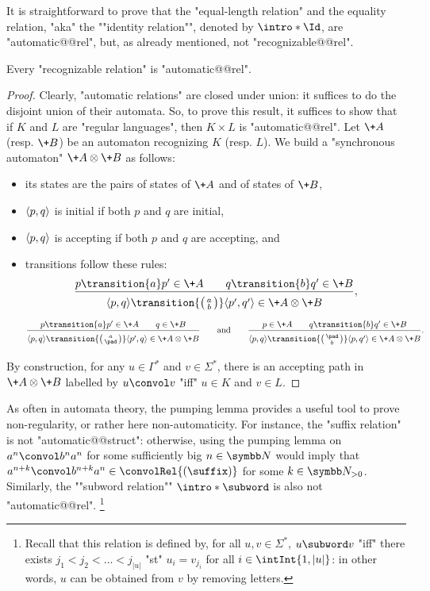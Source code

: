 It is straightforward to prove that the "equal-length relation"
and the equality relation, "aka" the \AP""identity relation"", denoted
by \AP$\intro*\Id$, are "automatic@@rel", but, as already mentioned, not "recognizable@@rel".

\begin{proposition}
	\label{prop:rec-implies-aut}
	Every "recognizable relation" is "automatic@@rel".
\end{proposition}

\begin{proof}
	Clearly, "automatic relations" are closed under union: it suffices to do the disjoint union
	of their automata.
	So, to prove this result, it suffices to show that if $K$ and $L$ are "regular languages",
	then $K \times L$ is "automatic@@rel".
	Let $\+A$ (resp. $\+B$) be an automaton recognizing $K$ (resp. $L$). 
	We build a "synchronous automaton" $\+A \otimes \+B$ as follows:
	\begin{itemize}
		\item its states are the pairs of states of $\+A$ and of states of $\+B$,
		\item $\langle p,q\rangle$ is initial if both $p$ and $q$ are initial,
		\item $\langle p,q\rangle$ is accepting if both $p$ and $q$ are accepting, and
		\item transitions follow these rules:
		\[\frac{
			p \transition{a} p' \in \+A \qquad q \transition{b} q' \in \+B
		}{
			\vphantom{\Big()}
			\tup{p,q} \transition{\pair{a}{b}} \tup{p',q'}
				\in \+A \otimes \+B
		},\]
		\vspace{-1em}
		\[\frac{
			p \transition{a} p' \in \+A \qquad q \in \+B
		}{
			\vphantom{\Big()}
			\tup{p,q} \transition{\pair{a}{\pad}} \tup{p',q}
				\in \+A \otimes \+B
		}
		\qquad\text{and}\qquad
		\frac{
			p \in \+A \qquad q \transition{b} q' \in \+B
		}{
			\vphantom{\Big()}
			\tup{p,q} \transition{\pair{\pad}{b}} \tup{p,q'}
				\in \+A \otimes \+B
		}.
		\]
	\end{itemize}
	By construction, for any $u\in \Gamma^*$ and $v\in \Sigma^*$,
	there is an accepting path in $\+A \otimes \+B$ labelled by $u \convol v$ 
	"iff" $u \in K$ and $v\in L$.
\end{proof}

As often in automata theory, the pumping lemma provides a useful tool to prove
non-regularity, or rather here non-automaticity.
For instance, the "suffix relation" is not "automatic@@struct": otherwise,
using the pumping lemma on $a^n \convol b^n a^n$ for some sufficiently big $n\in\N$
would imply that $a^{n+k} \convol b^{n+k} a^n \in \convolRel{(\suffix)}$ for some $k\in\Np$.
Similarly, the \AP""subword relation"" $\intro*\subword$ is also not "automatic@@rel".%
\footnote{Recall that this relation is defined by, for all $u, v \in \Sigma^*$,
$u \subword v$ "iff" there exists $j_1 < j_2 < \dotsc < j_{|u|}$ "st" $u_i = v_{j_{i}}$
for all $i \in \intInt{1, |u|}$: in other words, $u$ can be obtained from $v$ by removing letters.}

